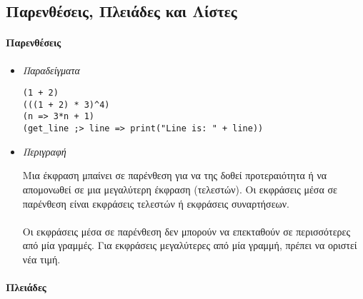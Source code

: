 \documentclass[diploma]{softlab-thesis}
\begin{document}
\newpage
\subsection{Παρενθέσεις, Πλειάδες και Λίστες}

\paragraph{Παρενθέσεις}

\begin{itemize}

\item \textit{Παραδείγματα}
\begin{verbatim}
(1 + 2)
(((1 + 2) * 3)^4)
(n => 3*n + 1)
(get_line ;> line => print("Line is: " + line))
\end{verbatim}

\item \textit{Περιγραφή}

Μια έκφραση μπαίνει σε παρένθεση για να της δοθεί προτεραιότητα ή να απομονωθεί
σε μια μεγαλύτερη έκφραση (τελεστών).  Οι εκφράσεις μέσα σε παρένθεση είναι
εκφράσεις τελεστών ή εκφράσεις συναρτήσεων.
\\\\
Οι εκφράσεις μέσα σε παρένθεση δεν μπορούν να επεκταθούν σε περισσότερες από
μία γραμμές. Για εκφράσεις μεγαλύτερες από μία γραμμή, πρέπει να οριστεί νέα
τιμή.

\end{itemize}

\paragraph{Πλειάδες}
\end{document}
